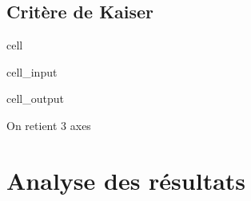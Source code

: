 \documentclass[letterpaper,10pt,english]{jupyterBook}
\begin{document}
\subsection{Critère de Kaiser}
\label{\detokenize{acp:critere-de-kaiser}}
\begin{sphinxuseclass}{cell}\begin{sphinxVerbatimInput}

\begin{sphinxuseclass}{cell_input}
\begin{sphinxVerbatim}[commandchars=\\\{\}]
  
     
\end{sphinxVerbatim}

\end{sphinxuseclass}\end{sphinxVerbatimInput}
\begin{sphinxVerbatimOutput}

\begin{sphinxuseclass}{cell_output}
\begin{sphinxVerbatim}[commandchars=\\\{\}]
On retient 3 axes
\end{sphinxVerbatim}

\end{sphinxuseclass}\end{sphinxVerbatimOutput}

\end{sphinxuseclass}

\section{Analyse des résultats}
\label{\detokenize{acp:analyse-des-resultats}}
\end{document}
